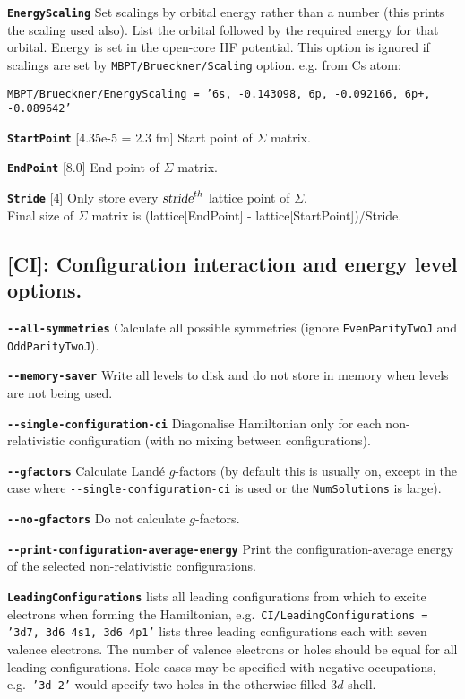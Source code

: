 \documentclass[a4paper,11pt]{article}
\newcommand{\option}[1]{\smallskip\noindent\textbf{\texttt{#1}}}
\newcommand{\code}[1]{\texttt{#1}}
\begin{document}
\option{EnergyScaling} Set scalings by orbital energy rather than a number (this prints the scaling used also). List the orbital followed by the required energy for that orbital. Energy is set in the open-core HF potential.
This option is ignored if scalings are set by \code{MBPT/Brueckner/Scaling} option.
e.g. from Cs atom:  {\code{MBPT/Brueckner/EnergyScaling = '6s, -0.143098, 6p, -0.092166, 6p+, -0.089642'}

\option{StartPoint} [4.35e-5 = 2.3 fm] Start point of $\Sigma$ matrix.

\option{EndPoint} [8.0] End point of $\Sigma$ matrix.

\option{Stride} [4] Only store every $\textsl{stride}^{th}$ lattice point of $\Sigma$.\\
Final size of $\Sigma$ matrix is (lattice[EndPoint] - lattice[StartPoint])/Stride.

\subsection{[CI]: Configuration interaction and energy level options.}

\option{-{}-all-symmetries} Calculate all possible symmetries (ignore \code{EvenParityTwoJ} and \code{OddParityTwoJ}).

\option{-{}-memory-saver} Write all levels to disk and do not store in memory when levels are not being used.

\option{-{}-single-configuration-ci} Diagonalise Hamiltonian only for each non-relativistic configuration (with no mixing between configurations).

\option{-{}-gfactors} Calculate Land\'e $g$-factors (by default this is usually on, except in the case where  \code{-{}-single-configuration-ci} is used or the \code{NumSolutions} is large).

\option{-{}-no-gfactors} Do not calculate $g$-factors.

\option{-{}-print-configuration-average-energy} Print the configuration-average energy of the selected non-relativistic configurations.

\option{LeadingConfigurations} lists all leading configurations from which to excite electrons when forming the Hamiltonian, e.g.~\texttt{CI/LeadingConfigurations = '3d7, 3d6 4s1, 3d6 4p1'} lists three leading configurations each with seven valence electrons. The number of valence electrons or holes should be equal for all leading configurations. Hole cases may be specified with negative occupations, e.g.~\code{'3d-2'} would specify two holes in the otherwise filled $3d$ shell.

}
\end{document}
